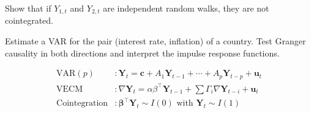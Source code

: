 \begin{exercise}[$\star\star$]
Show that if $Y_{1,t}$ and $Y_{2,t}$ are independent random walks, they are not cointegrated.
\end{exercise}

\begin{exercise}
Estimate a VAR for the pair (interest rate, inflation) of a country. Test Granger causality in both directions and interpret the impulse response functions.
\end{exercise}

\begin{keyformulas}
\begin{align*}
\text{VAR}(p) &: \bm{Y}_t = \bm{c}+A_1\bm{Y}_{t-1}+\cdots+A_p\bm{Y}_{t-p}+\bm{u}_t \\
\text{VECM} &: \nabla\bm{Y}_t=\alpha\beta^\top\bm{Y}_{t-1}+\sum\Gamma_i\nabla\bm{Y}_{t-i}+\bm{u}_t \\
\text{Cointegration} &: \bm\beta^\top\bm{Y}_t\sim I(0)\text{ with }\bm{Y}_t\sim I(1)
\end{align*}
\end{keyformulas}
